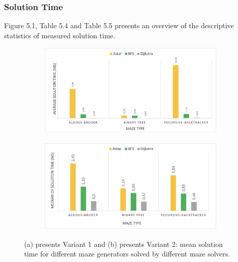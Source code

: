  \newline
 \newline
 \newline
 \newline
 \newline   
\subsubsection{Solution Time}
Figure 5.1, Table 5.4 and Table 5.5 presents an overview of the descriptive statistics of measured solution time.\\
\begin{figure}[!h]
    \centering
    \begin{subfigure}[b]{0.7\textwidth}
        \centering
        \includegraphics[width=\textwidth]{averagetime_variant1.png}
        \caption{}
    \end{subfigure}
    \begin{subfigure}[b]{0.7\textwidth}  
        \centering 
        \includegraphics[width=\textwidth]{averagetime_variant2.png}
        \caption{}
    \end{subfigure}
    \caption[]{(a) presents Variant 1 and (b) presents Variant 2: mean solution time for different maze generators solved by different maze solvers.}
\end{figure}
